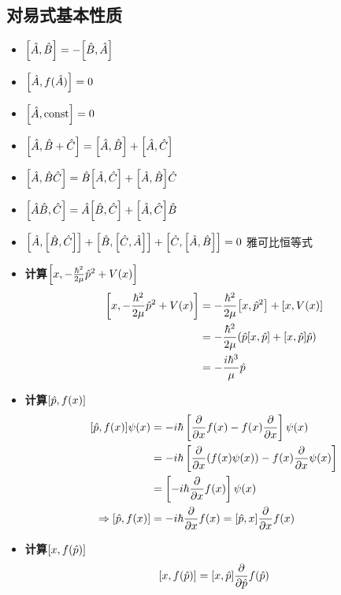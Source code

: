 \subsection{对易式基本性质}
\begin{itemize}
    \item $\comm{\hat{A}}{\hat{B}} = -\comm{\hat{B}}{\hat{A}}$
    \item $\comm{\hat{A}}{f(\hat{A})} = 0$
    \item $\comm{\hat{A}}{\text{const}} = 0$
    \item $\comm{\hat{A}}{\hat{B} + \hat{C}} = \comm{\hat{A}}{\hat{B}} + \comm{\hat{A}}{\hat{C}}$
    \item $\comm{\hat{A}}{\hat{B}\hat{C}} = \hat{B}\comm{\hat{A}}{\hat{C}} + \comm{\hat{A}}{\hat{B}}\hat{C}$
    \item $\comm{\hat{A}\hat{B}}{\hat{C}} = \hat{A}\comm{\hat{B}}{\hat{C}} + \comm{\hat{A}}{\hat{C}}\hat{B}$
    \item $\comm{\hat{A}}{\comm{\hat{B}}{\hat{C}}} + \comm{\hat{B}}{\comm{\hat{C}}{\hat{A}}} + \comm{\hat{C}}{\comm{\hat{A}}{\hat{B}}} = 0$ \quad 雅可比恒等式
\end{itemize}
\begin{extension}{}
    \begin{itemize}
        \item \textbf{计算$\comm{x}{-\frac{\hbar^2}{2\mu} \hat{p}^2 + V(x)}$}
        \begin{align*}
            \comm{x}{-\frac{\hbar^2}{2\mu} \hat{p}^2 + V(x)} &= -\frac{\hbar^2}{2\mu} \comm{x}{\hat{p}^2} + \comm{x}{V(x)} \\
            &= -\frac{\hbar^2}{2\mu} (\hat{p} \comm{x}{\hat{p}} + \comm{x}{\hat{p}} \hat{p}) \\
            &= -\frac{i\hbar^3}{\mu} \hat{p}
        \end{align*}
        \item \textbf{计算$\comm{\hat{p}}{f(x)}$}
        \begin{align*}
            \comm{\hat{p}}{f(x)} \psi(x) &= -i\hbar \left[ \pdv{x} f(x) - f(x) \pdv{x} \right] \psi(x) \\
            &= -i\hbar \left[ \pdv{x} (f(x) \psi(x)) - f(x) \pdv{x} \psi(x) \right] \\
            &= \left[ -i\hbar \pdv{x} f(x) \right] \psi(x) \\
            \Rightarrow \comm{\hat{p}}{f(x)} &= -i\hbar \pdv{x} f(x) = \comm{\hat{p}}{x} \pdv{x} f(x)
        \end{align*}
        \item \textbf{计算$\comm{x}{f(\hat{p})}$}
        \[\comm{x}{f(\hat{p})} = \comm{x}{\hat{p}} \frac{\partial}{\partial \hat{p}} f(\hat{p})\]
    \end{itemize}
\end{extension}


